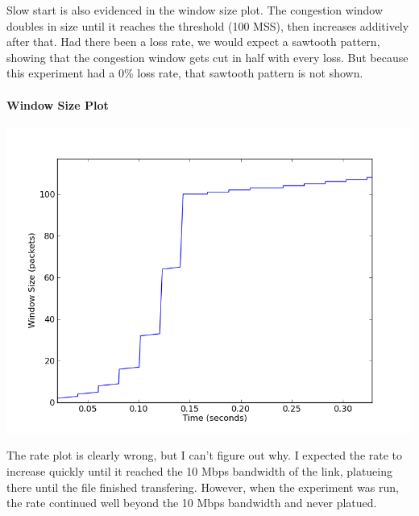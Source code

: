 \documentclass[11pt]{article}
\begin{document}
Slow start is also evidenced in the window size plot. The congestion window doubles in size until it reaches the threshold (100 MSS), then increases additively after that. Had there been a loss rate, we would expect a sawtooth pattern, showing that the congestion window gets cut in half with every loss. But because this experiment had a 0\% loss rate, that sawtooth pattern is not shown.

\paragraph{Window Size Plot} \hspace{2mm}
\begin{center}
\includegraphics[width=15cm]{../plot/one_flow_0_loss/window_size.png}
\end{center}

The rate plot is clearly wrong, but I can't figure out why. I expected the rate to increase quickly until it reached the 10 Mbps bandwidth of the link, platueing there until the file finished transfering. However, when the experiment was run, the rate continued well beyond the 10 Mbps bandwidth and never platued.
\end{document}
